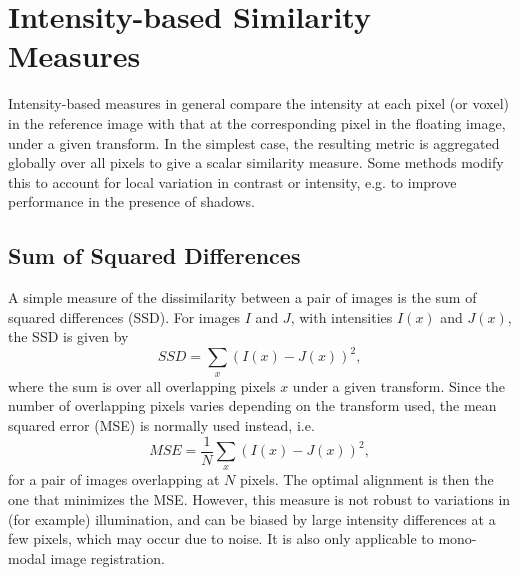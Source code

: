\documentclass{report}
\begin{document}
\section{Intensity-based Similarity Measures}
Intensity-based measures in general compare the intensity at each pixel (or voxel) in the reference image with that at the corresponding pixel in the floating image, under a given transform. In the simplest case, the resulting metric is aggregated globally over all pixels to give a scalar similarity measure. Some methods modify this to account for local variation in contrast or intensity, e.g. to improve performance in the presence of shadows.
\subsection{Sum of Squared Differences}
A simple measure of the dissimilarity between a pair of images is the sum of squared differences (SSD). For images $I$ and $J$, with intensities $I(x)$ and $J(x)$, the SSD is given by
\[
SSD = \sum_{x} (I(x)-J(x))^2,
\]
where the sum is over all overlapping pixels $x$ under a given transform. Since the number of overlapping pixels varies depending on the transform used, the mean squared error (MSE) is normally used instead, i.e.
\[
MSE = \frac{1}{N}\sum_{x} (I(x)-J(x))^2,
\]
for a pair of images overlapping at $N$ pixels. The optimal alignment is then the one that minimizes the MSE. However, this measure is not robust to variations in (for example) illumination, and can be biased by large intensity differences at a few pixels, which may occur due to noise. It is also only applicable to mono-modal image registration.
\end{document}
